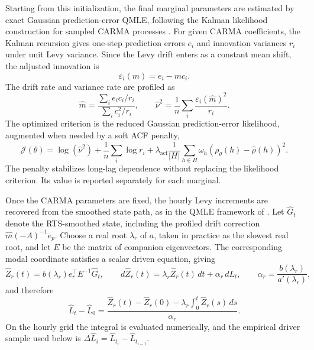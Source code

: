 Starting from this initialization, the final marginal parameters are estimated
by exact Gaussian prediction-error QMLE, following the Kalman likelihood
construction for sampled CARMA processes \citep{BrockwellLindner2024Ch19}. For
given CARMA coefficients, the Kalman recursion gives one-step prediction errors
\(e_i\) and innovation variances \(r_i\) under unit Levy variance. Since the
Levy drift enters as a constant mean shift, the adjusted innovation is
\[
  \varepsilon_i(m)=e_i-mc_i .
\]
The drift rate and variance rate are profiled as
\begin{equation}
  \widehat m
  =
  \frac{\sum_i e_i c_i/r_i}{\sum_i c_i^2/r_i},
  \qquad
  \widehat \nu^2
  =
  \frac{1}{n}\sum_i
  \frac{\varepsilon_i(\widehat m)^2}{r_i}.
  \label{eq:carma-qmle-profile}
\end{equation}
The optimized criterion is the reduced Gaussian prediction-error likelihood,
augmented when needed by a soft ACF penalty,
\begin{equation}
  \mathcal J(\theta)
  =
  \log(\widehat\nu^2)
  +
  \frac{1}{n}\sum_i \log r_i
  +
  \lambda_{\mathrm{acf}}
  \frac{1}{|H|}
  \sum_{h\in H}
  \omega_h
  \left(\rho_\theta(h)-\widehat\rho(h)\right)^2 .
  \label{eq:carma-qmle-objective}
\end{equation}
The penalty stabilizes long-lag dependence without replacing the likelihood
criterion. Its value is reported separately for each marginal.

Once the CARMA parameters are fixed, the hourly Levy increments are recovered
from the smoothed state path, as in the QMLE framework of
\citet{BrockwellLindner2024Ch19}. Let \(\widehat G_t\) denote the RTS-smoothed
state, including the profiled drift correction \(\widehat m(-A)^{-1}e_p\).
Choose a real root \(\lambda_r\) of \(a\), taken in practice as the slowest real
root, and let \(E\) be the matrix of companion eigenvectors. The corresponding
modal coordinate satisfies a scalar driven equation, giving
\begin{equation}
  \widehat Z_r(t)=b(\lambda_r)e_r^\top E^{-1}\widehat G_t,\qquad
  d\widehat Z_r(t)=\lambda_r\widehat Z_r(t)\,dt+\alpha_r\,dL_t,
  \qquad
  \alpha_r=\frac{b(\lambda_r)}{a'(\lambda_r)},
  \label{eq:levy-modal-recovery}
\end{equation}
and therefore
\begin{equation}
  \widehat L_t-\widehat L_0
  =
  \frac{\widehat Z_r(t)-\widehat Z_r(0)
  -\lambda_r\int_0^t \widehat Z_r(s)\,ds}{\alpha_r}.
  \label{eq:levy-driver-recovery}
\end{equation}
On the hourly grid the integral is evaluated numerically, and the empirical
driver sample used below is
\(\Delta\widehat L_i=\widehat L_{t_i}-\widehat L_{t_{i-1}}\).

